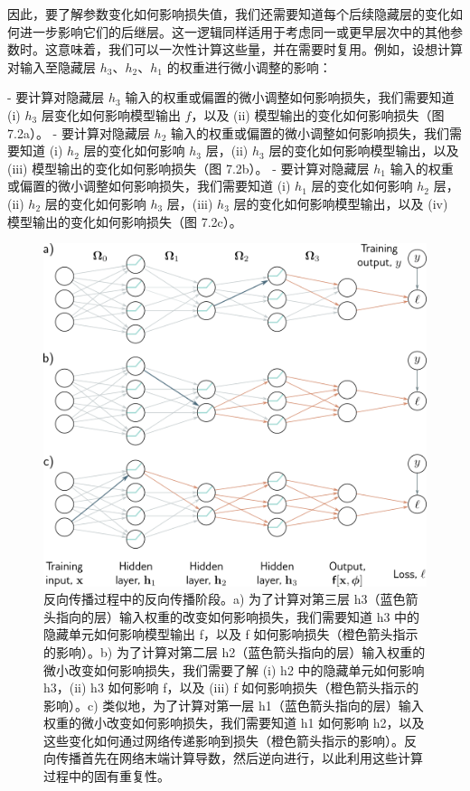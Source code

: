 因此，要了解参数变化如何影响损失值，我们还需要知道每个后续隐藏层的变化如何进一步影响它们的后继层。这一逻辑同样适用于考虑同一或更早层次中的其他参数时。这意味着，我们可以一次性计算这些量，并在需要时复用。例如，设想计算对输入至隐藏层 \(h_3\)、\(h_2\)、\(h_1\) 的权重进行微小调整的影响：

- 要计算对隐藏层 \(h_3\) 输入的权重或偏置的微小调整如何影响损失，我们需要知道 (i) \(h_3\) 层变化如何影响模型输出 \(f\)，以及 (ii) 模型输出的变化如何影响损失（图 7.2a）。
- 要计算对隐藏层 \(h_2\) 输入的权重或偏置的微小调整如何影响损失，我们需要知道 (i) \(h_2\) 层的变化如何影响 \(h_3\) 层，(ii) \(h_3\) 层的变化如何影响模型输出，以及 (iii) 模型输出的变化如何影响损失（图 7.2b）。
- 要计算对隐藏层 \(h_1\) 输入的权重或偏置的微小调整如何影响损失，我们需要知道 (i) \(h_1\) 层的变化如何影响 \(h_2\) 层，(ii) \(h_2\) 层的变化如何影响 \(h_3\) 层，(iii) \(h_3\) 层的变化如何影响模型输出，以及 (iv) 模型输出的变化如何影响损失（图 7.2c）。

\begin{figure}[ht!]
\centering
\includegraphics[width=0.7\linewidth]{png/chapter7/Train2BPIntuitions2.png}
\caption{反向传播过程中的反向传播阶段。a) 为了计算对第三层 h3（蓝色箭头指向的层）输入权重的改变如何影响损失，我们需要知道 h3 中的隐藏单元如何影响模型输出 f，以及 f 如何影响损失（橙色箭头指示的影响）。b) 为了计算对第二层 h2（蓝色箭头指向的层）输入权重的微小改变如何影响损失，我们需要了解 (i) h2 中的隐藏单元如何影响 h3，(ii) h3 如何影响 f，以及 (iii) f 如何影响损失（橙色箭头指示的影响）。c) 类似地，为了计算对第一层 h1（蓝色箭头指向的层）输入权重的微小改变如何影响损失，我们需要知道 h1 如何影响 h2，以及这些变化如何通过网络传递影响到损失（橙色箭头指示的影响）。反向传播首先在网络末端计算导数，然后逆向进行，以此利用这些计算过程中的固有重复性。}
\end{figure}

